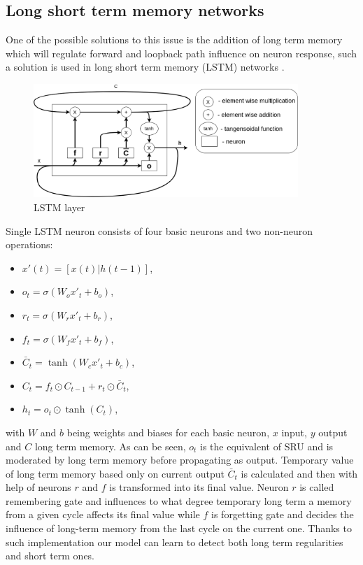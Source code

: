 \subsection{Long short term memory networks}
One of the possible solutions to this issue is the addition of long term memory which will regulate
forward and loopback path influence on neuron response, such a solution is used in long short
term memory (LSTM) networks \cite{Hochreiter1997}.
\begin{figure}[h] 
	\centering
	\includegraphics[width=10cm]{res/lstm}
	\caption{LSTM layer}
	\label{fig:lstm}
\end{figure}
Single LSTM neuron consists of four basic neurons and two non-neuron operations:
\begin{itemize}
	\item $x'(t)=[x(t)|h(t-1)]$,
	\item $o_t=\sigma (W_o x'_t+b_o)$,
	\item $r_t=\sigma (W_r x'_t+b_r)$,
	\item $f_t=\sigma (W_f x'_t+b_f)$,
	\item $\bar{C}_t=\tanh (W_c x'_t+b_c)$,
	\item $C_t=f_t\odot C_{t-1}+r_t\odot \bar{C}_t$,
	\item $h_t=o_t\odot \tanh (C_t)$,
\end{itemize}
with $W$ and $b$ being weights and biases for each basic neuron, $x$ input, $y$ output and
$C$ long term memory. As can be seen, $o_t$ is the equivalent of SRU and is moderated by
long term memory before propagating as output. Temporary value of long term memory based
only on current output $\bar{C}_t$ is calculated and then with help of neurons $r$ and $f$
is transformed into its final value.
Neuron $r$ is called remembering gate and influences to what degree temporary long term
a memory from a given cycle affects its final value while $f$ is forgetting gate and
decides the influence of long-term memory from the last cycle on the current one.
Thanks to such implementation our model can learn to detect both long term regularities and 
short term ones.

